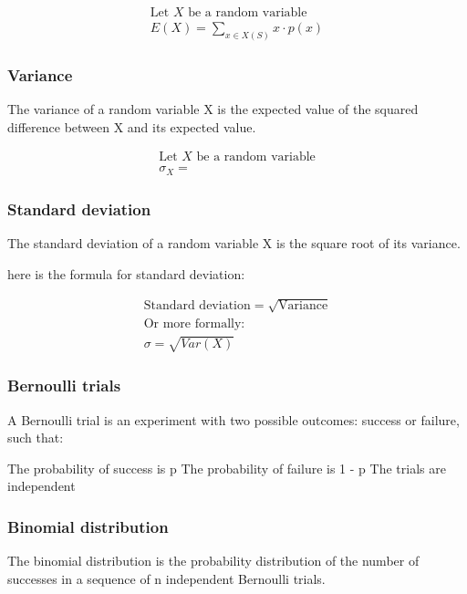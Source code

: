\documentclass{article}
\begin{document}
\begin{align*}
    \text{Let } X \text{ be a random variable} \\
    E(X) = \sum_{x \in X(S)} x \cdot p(x)
\end{align*}

\subsubsection{Variance}

The variance of a random variable X is the expected value of the squared difference between X and its expected value.

\begin{align*}
    \text{Let } X \text{ be a random variable} \\
    \sigma_X = 
\end{align*}

\subsubsection{Standard deviation}

The standard deviation of a random variable X is the square root of its variance.

here is the formula for standard deviation:

\begin{align*}
    \text{Standard deviation} = \sqrt{\text{Variance}} \\
    \text{Or more formally:} \\
    \sigma = \sqrt{Var(X)}
\end{align*}

\subsubsection{Bernoulli trials}

A Bernoulli trial is an experiment with two possible outcomes: success or failure, such that:

\begin{outline}
    \1 The probability of success is p
    \1 The probability of failure is 1 - p
    \1 The trials are independent
\end{outline}

\subsubsection{Binomial distribution}

The binomial distribution is the probability distribution of the number of successes in a sequence of n independent Bernoulli trials.
\end{document}

